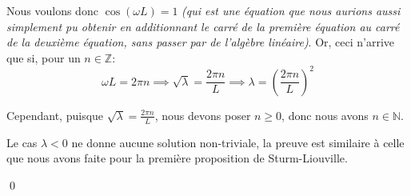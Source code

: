 \documentclass[a4paper]{article}
\begin{document}
{{        Nous voulons donc $\cos\left(\omega L\right) = 1$ \textit{(qui est une équation que nous aurions aussi simplement pu obtenir en additionnant le carré de la première équation au carré de la deuxième équation, sans passer par de l'algèbre linéaire)}. Or, ceci n'arrive que si, pour un $n \in \mathbb{Z}$: 
        \[\omega L = 2\pi n \implies \sqrt{\lambda} = \frac{2 \pi n}{L} \implies \lambda = \left(\frac{2\pi n}{L}\right)^2\]

        Cependant, puisque $\sqrt{\lambda} = \frac{2\pi n}{L}$, nous devons poser $n \geq 0$, donc nous avons $n \in \mathbb{N}$.

        Le cas $\lambda < 0$ ne donne aucune solution non-triviale, la preuve est similaire à celle que nous avons faite pour la première proposition de Sturm-Liouville.

        \qed
    }
}
\end{document}
